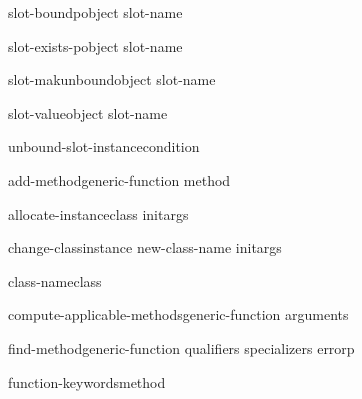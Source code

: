 \documentclass[10pt,english]{book}
\begin{document}
\begin{function}{slot-boundp}{object slot-name}
  
\end{function}

\begin{function}{slot-exists-p}{object slot-name}
  
\end{function}

\begin{function}{slot-makunbound}{object slot-name}
  
\end{function}

\begin{function}{slot-value}{object slot-name}
  
\end{function}

\begin{function}{unbound-slot-instance}{condition}
  
\end{function}

\begin{generic}{add-method}{generic-function method}
  
\end{generic}

\begin{generic}{allocate-instance}{class \rest initargs}
  
\end{generic}

\begin{generic}{change-class}{instance new-class-name \rest initargs \akeys}
  
\end{generic}

\begin{generic}{class-name}{class}
  
\end{generic}

\begin{generic}{compute-applicable-methods}{generic-function arguments}
  
\end{generic}

\begin{generic}{find-method}{generic-function qualifiers specializers \op errorp}
  
\end{generic}

\begin{generic}{function-keywords}{method}
  
\end{generic}
\end{document}

